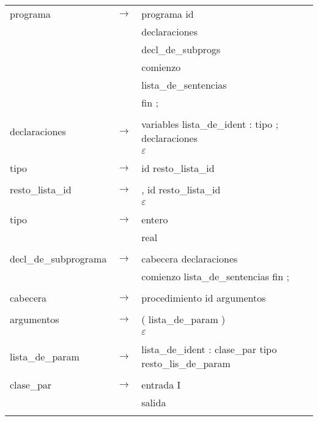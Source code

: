 \documentclass[11pt,twoside,a4paper]{book}
\begin{document}
\begin{tabular}{l c l}
programa & $ \rightarrow $ & programa id \\
                  & & declaraciones \\
                  & & decl\_de\_subprogs \\
                  & & comienzo \\
                  & & lista\_de\_sentencias \\
                  & & fin ; \\
\\

declaraciones & $ \rightarrow $ & variables lista\_de\_ident : tipo ; declaraciones \\
                  & & $ \varepsilon $ \\
\\

tipo & $ \rightarrow $ & id resto\_lista\_id \\
\\

resto\_lista\_id & $ \rightarrow $ & , id resto\_lista\_id \\
                  & & $ \varepsilon $ \\
\\

tipo & $ \rightarrow $ & entero \\
                  & & real \\
\\

decl\_de\_subprograma & $ \rightarrow $ & cabecera declaraciones \\
                  & & comienzo lista\_de\_sentencias fin ; \\
\\

cabecera &  $ \rightarrow $  & procedimiento id argumentos\\
\\

argumentos &  $ \rightarrow $  & ( lista\_de\_param ) \\
                  & &  $ \varepsilon $ \\
\\

lista\_de\_param &  $ \rightarrow $ & lista\_de\_ident : clase\_par tipo resto\_lis\_de\_param \\
\\

clase\_par & $ \rightarrow $ & entrada I \\
                  & &  salida \\
\\


\end{tabular}
\end{document}
